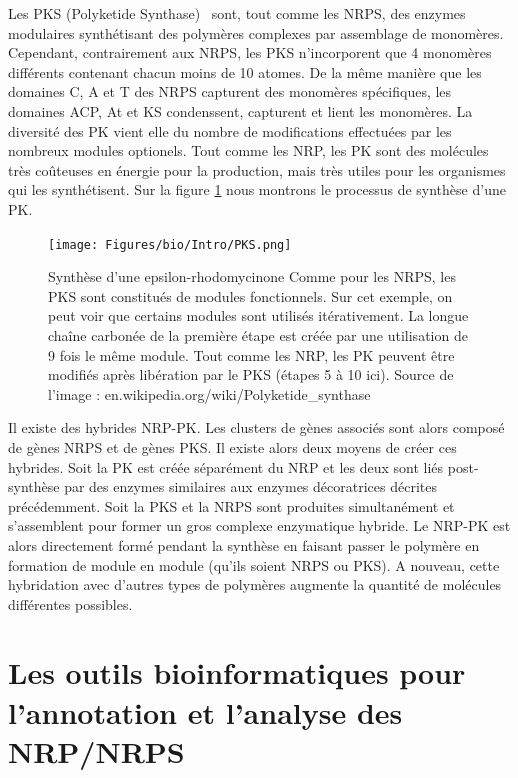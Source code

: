 Les PKS (Polyketide Synthase)~\cite{shen_polyketide_2003,staunton_polyketide_2001} sont, tout comme les NRPS, des enzymes modulaires synthétisant des polymères complexes par assemblage de monomères.
Cependant, contrairement aux NRPS, les PKS n'incorporent que 4 monomères différents contenant chacun moins de 10 atomes.
De la même manière que les domaines C, A et T des NRPS capturent des monomères spécifiques, les domaines ACP, At et KS condenssent, capturent et lient les monomères.
La diversité des PK vient elle du nombre de modifications effectuées par les nombreux modules optionels.
Tout comme les NRP, les PK sont des molécules très coûteuses en énergie pour la production, mais très utiles pour les organismes qui les synthétisent.
Sur la figure \ref{pks} nous montrons le processus de synthèse d'une PK.

\begin{figure}
  \begin{center}
    \texttt{[image: Figures/bio/Intro/PKS.png]}
    \caption{\label{pks}Synthèse d'une epsilon-rhodomycinone
    Comme pour les NRPS, les PKS sont constitués de modules fonctionnels.
    Sur cet exemple, on peut voir que certains modules sont utilisés itérativement.
    La longue chaîne carbonée de la première étape est créée par une utilisation de 9 fois le même module.
    Tout comme les NRP, les PK peuvent être modifiés après libération par le PKS (étapes 5 à 10 ici).
    Source de l'image : en.wikipedia.org/wiki/Polyketide\_synthase}
  \end{center}
\end{figure}

Il existe des hybrides NRP-PK.
Les clusters de gènes associés sont alors composé de gènes NRPS et de gènes PKS.
Il existe alors deux moyens de créer ces hybrides.
Soit la PK est créée séparément du NRP et les deux sont liés post-synthèse par des enzymes similaires aux enzymes décoratrices décrites précédemment.
Soit la PKS et la NRPS sont produites simultanément et s'assemblent pour former un gros complexe enzymatique hybride.
Le NRP-PK est alors directement formé pendant la synthèse en faisant passer le polymère en formation de module en module (qu'ils soient NRPS ou PKS).
A nouveau, cette hybridation avec d'autres types de polymères augmente la quantité de molécules différentes possibles.









\section{Les outils bioinformatiques pour l'annotation et l'analyse des NRP/NRPS}
\label{bioanalyse}

